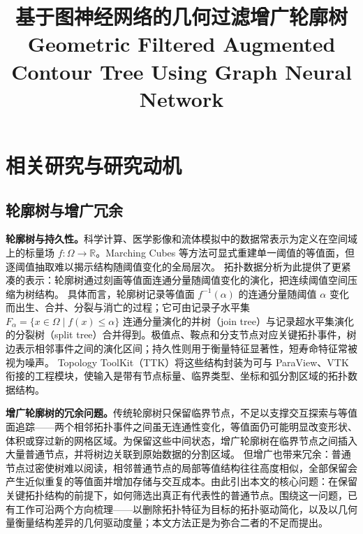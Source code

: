 \documentclass[twocolumn, a4paper, 10pt]{article}
\title{\textbf{基于图神经网络的几何过滤增广轮廓树}\\[6pt]
  \large\textmd{Geometric Filtered Augmented Contour Tree Using Graph Neural Network}}
\author{}
\date{}
\begin{document}
\raggedbottom
\sloppy
\setlength{\emergencystretch}{2em}
\setlength{\parindent}{2em}
\setlength{\parskip}{0pt}

\maketitle

\setcounter{section}{1}

\section{相关研究与研究动机}

\subsection{轮廓树与增广冗余}

\textbf{轮廓树与持久性。}科学计算、医学影像和流体模拟中的数据常表示为定义在空间域上的标量场 $f:\Omega\rightarrow\mathbb{R}$。Marching Cubes 等方法可显式重建单一阈值的等值面，但逐阈值抽取难以揭示结构随阈值变化的全局层次。\cite{lorensen_cline_1987} 拓扑数据分析为此提供了更紧凑的表示：轮廓树通过刻画等值面连通分量随阈值变化的演化，把连续阈值空间压缩为树结构。\cite{van_kreveld_1997,carr_contour_2003} 具体而言，轮廓树记录等值面 $f^{-1}(\alpha)$ 的连通分量随阈值 $\alpha$ 变化而出生、合并、分裂与消亡的过程；它可由记录子水平集 $F_\alpha=\{x\in\Omega\mid f(x)\leq\alpha\}$ 连通分量演化的并树（join tree）与记录超水平集演化的分裂树（split tree）合并得到。极值点、鞍点和分支节点对应关键拓扑事件，树边表示相邻事件之间的演化区间；持久性则用于衡量特征显著性，短寿命特征常被视为噪声。\cite{edelsbrunner_persistence_2002} Topology ToolKit（TTK）将这些结构封装为可与 ParaView、VTK 衔接的工程模块，使输入是带有节点标量、临界类型、坐标和弧分割区域的拓扑数据结构。\cite{tierny_ttk_2018}

\textbf{增广轮廓树的冗余问题。}传统轮廓树只保留临界节点，不足以支撑交互探索与等值面追踪——两个相邻拓扑事件之间虽无连通性变化，等值面仍可能明显改变形状、体积或穿过新的网格区域。为保留这些中间状态，增广轮廓树在临界节点之间插入大量普通节点，并将树边关联到原始数据的分割区域。\cite{gueunet_act_2019,gueunet_forests_2016,li_distributed_2024} 但增广也带来冗余：普通节点过密使树难以阅读，相邻普通节点的局部等值结构往往高度相似，全部保留会产生近似重复的等值面并增加存储与交互成本。由此引出本文的核心问题：在保留关键拓扑结构的前提下，如何筛选出真正有代表性的普通节点。围绕这一问题，已有工作可沿两个方向梳理——以删除拓扑特征为目标的拓扑驱动简化，以及以几何量衡量结构差异的几何驱动度量；本文方法正是为弥合二者的不足而提出。
\end{document}
